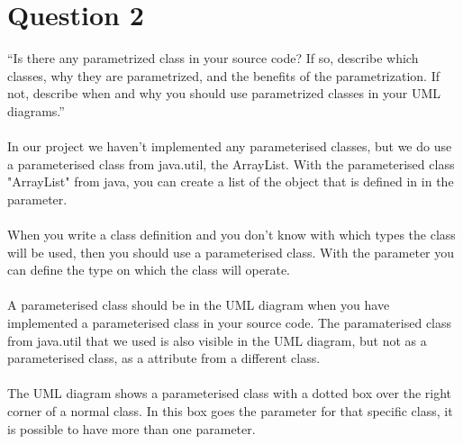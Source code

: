 \section{Question 2}

``Is there any parametrized class in your source code? If so, describe which classes, why they are
parametrized, and the benefits of the parametrization. If not, describe when and why you should use
parametrized classes in your UML diagrams.''
\\
\\
In our project we haven't implemented any parameterised classes, but we do use a parameterised class from java.util, the ArrayList. With the parameterised class "ArrayList" from java, you can create a list of the object that is defined in in the parameter.\\
\\
When you write a class definition and you don't know with which types the class will be used, then you should use a parameterised class. With the parameter you can define the type on which the class will operate.\\
\\
A parameterised class should be in the UML diagram when you have implemented a parameterised class in your source code. The paramaterised class from java.util that we used is also visible in the UML diagram, but not as a parameterised class, as a attribute from a different class.\\
\\
The UML diagram shows a parameterised class with a dotted box over the right corner of a normal class. In this box goes the parameter for that specific class, it is possible to have more than one parameter. 